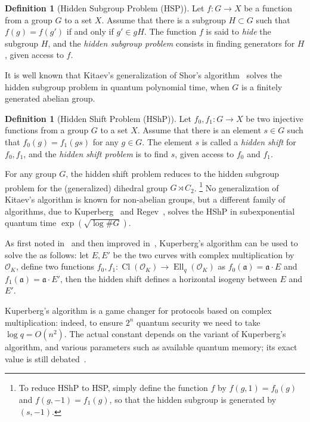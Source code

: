 \documentclass[10pt]{article}
\theoremstyle{plain}
\theoremstyle{definition}
\newtheorem{definition}[theorem]{Definition}
\DeclareMathOperator{\Cl}{Cl}
\DeclareMathOperator{\Ell}{Ell}
\def\O{\ensuremath{\mathcal{O}}}
\def\a{\ensuremath{\mathfrak{a}}}
\begin{document}
\begin{prposition}
\begin{definition}[Hidden Subgroup Problem (HSP)]
  Let $f:G→X$ be a function from a group $G$ to a set $X$. %
  Assume that there is a subgroup $H⊂G$ such that $f(g)=f(g')$ if and
  only if $g'∈gH$. %
  The function $f$ is said to \emph{hide} the subgroup $H$, and the
  \emph{hidden subgroup problem} consists in finding generators for
  $H$, given access to $f$.
\end{definition}

It is well known that Kitaev's generalization of Shor's
algorithm~\cite{kitaev1995hsp} solves the hidden subgroup problem in
quantum polynomial time, when $G$ is a finitely generated abelian
group. %

\begin{definition}[Hidden Shift Problem (HShP)]
  Let $f_0,f_1:G→X$ be two injective functions from a group $G$ to a
  set $X$. %
  Assume that there is an element $s∈G$ such that $f_0(g)=f_1(gs)$ for
  any $g∈G$. %
  The element $s$ is called a \emph{hidden shift} for $f_0,f_1$, and
  the \emph{hidden shift problem} is to find $s$, given access to
  $f_0$ and $f_1$. %
\end{definition}

For any group $G$, the hidden shift problem reduces to the hidden
subgroup problem for the (generalized) dihedral group $G\rtimes C_2$.%
\footnote{To reduce HShP to HSP, simply define the function $f$ by
  $f(g,1) = f_0(g)$ and $f(g,-1) = f_1(g)$, so that the hidden
  subgroup is generated by $(s,-1)$.} %
No generalization of Kitaev's algorithm is known for non-abelian
groups, but a different family of algorithms, due to
Kuperberg~\cite{Kup,Kuperberg2013} and Regev~\cite{regev04}, solves
the HShP in subexponential quantum time $\exp(\sqrt{\log\#G})$. %

As first noted in~\cite{childs2014constructing} and then improved
in~\cite{BIJ18,Jao-etal-kuperberg-2018,EC:BonSch20,EC:Peikert20},
Kuperberg's algorithm can be used to solve the  as
follows: let $E,E'$ be the two curves with complex multiplication by
$\O_K$, define two functions $f_0,f_1:\Cl(\O_K)\to\Ell_q(\O_K)$ as
$f_0(\a)=\a·E$ and $f_1(\a)=\a·E'$, then the hidden shift defines a
horizontal isogeny between $E$ and $E'$. %

Kuperberg's algorithm is a game changer for protocols based on complex
multiplication: indeed, to ensure $2^n$ quantum security we need to
take $\log q=O(n^2)$. %
The actual constant depends on the variant of Kuperberg's algorithm,
and various parameters such as available quantum memory; its exact
value is still
debated~\cite{EC:BLMP19,EC:Peikert20,cryptoeprint:2020:1520}.


\end{prposition}
\end{document}
